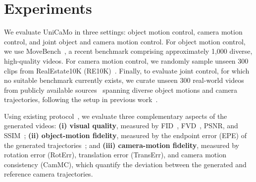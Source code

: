 \ifdefined\arxivbuild\else\documentclass{article}\fi %
\begin{document}
 
%
%


\section{Experiments}
\label{sec:experiments}

We evaluate UniCaMo in three settings: object motion control, camera motion control, and joint object and camera motion control. For object motion control, we use MoveBench~\citep{chu2025wan}, a recent benchmark comprising approximately 1,000 diverse, high-quality videos. For camera motion control, we randomly sample unseen 300 clips from RealEstate10K (RE10K)~\citep{zhou2018stereo}. Finally, to evaluate joint control, for which no suitable benchmark currently exists, we curate unseen 300 real-world videos from publicly available sources~\citep{Pexels_dataset} spanning diverse object motions and camera trajectories, following the setup in previous work~\citep{chu2025wan,zhang2026symphomotion}.


Using existing  protocol~\citep{chu2025wan,ren2025gen3c,wang2024motionctrl}, we evaluate three complementary aspects of the generated videos: \textbf{(i) visual quality}, measured by FID~\citep{fid}, FVD~\citep{fvd}, PSNR, and SSIM~\citep{ssim}; \textbf{(ii) object-motion fidelity}, measured by the endpoint error (EPE) of the generated trajectories~\citep{chu2025wan}; and \textbf{(iii) camera-motion fidelity}, measured by rotation error (RotErr), translation error (TransErr), and camera motion consistency (CamMC), which quantify the deviation between the generated and reference camera trajectories.

\end{document}

